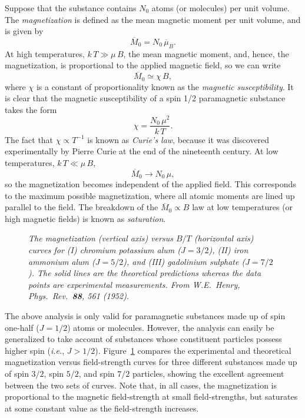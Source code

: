 Suppose that the substance contains $N_0$ atoms (or molecules) per unit volume.
The {\em magnetization}\/ is defined as the mean magnetic moment per unit
volume, and is given by
\begin{equation}
\overline{M}_0 = N_0\, \overline{\mu}_B.
\end{equation} 
At high temperatures, $k\, T \gg \mu\, B$, the mean magnetic moment, and, hence, the 
magnetization, is proportional to the applied magnetic field, so we can write
\begin{equation}
\overline{M}_0 \simeq \chi\, B,
\end{equation}
where $\chi$ is a constant of proportionality known as the 
{\em magnetic susceptibility}.
It is clear that the magnetic susceptibility of a spin 1/2 paramagnetic substance
takes the form
\begin{equation}
\chi = \frac{N_0\, \mu^2}{k\,T}.
\end{equation}
The fact that $\chi\propto T^{-1}$ is known as {\em Curie's law}, because it
was discovered experimentally by Pierre Curie at the end of the nineteenth  century. 
At low temperatures, $k\, T \ll\mu\, B$, 
\begin{equation}
\overline{M}_0 \rightarrow N_0 \,\mu,
\end{equation}
so the magnetization becomes independent of the applied field. This corresponds to
the maximum possible magnetization, where all atomic moments are lined up
parallel to the field. The breakdown of the $\overline{M}_0 \propto B$ law
at low temperatures (or high magnetic fields) is known as {\em saturation}. 

\begin{figure}
\epsfysize=4.5in
\centerline{}
\caption{\em The magnetization (vertical axis) versus $B/T$ (horizontal axis) curves
for (I) chromium potassium alum ($J=3/2$), (II) iron ammonium alum ($J=5/2$), and
(III) gadolinium sulphate ($J=7/2$). The solid lines are the theoretical predictions
whereas 
 the data points are experimental measurements. From W.E.~Henry, Phys.\ Rev.\ {\bf 88}, 561 (1952).
}\label{fspin}
\end{figure}

The above analysis is only valid for paramagnetic substances made up of
spin one-half ($J=1/2$) atoms or molecules. However, 
the analysis can easily be generalized
to take account of substances whose constituent  particles possess higher spin 
({\em i.e.}, $J>1/2$). Figure~\ref{fspin} compares
 the experimental and theoretical magnetization versus
field-strength curves for three different substances made up of spin $3/2$, spin $5/2$,
and spin $7/2$ particles, showing the excellent agreement between the two sets of
curves. Note that, in all cases, the magnetization is proportional to the
magnetic field-strength at small field-strengths, but saturates at some
constant value as the field-strength increases. 

